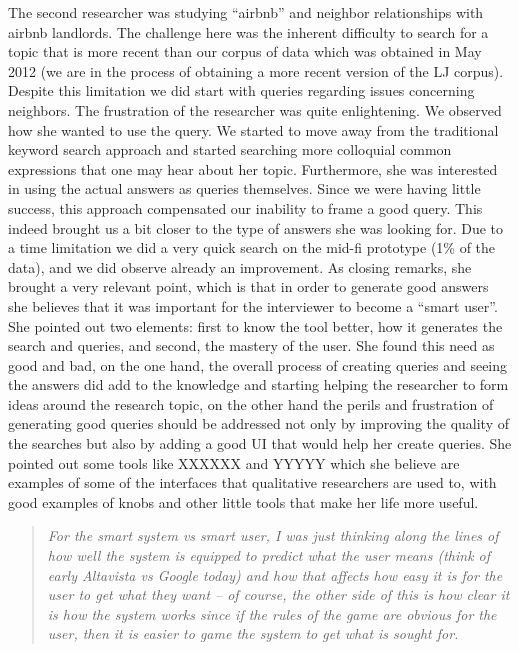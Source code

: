 \documentclass{sigchi}
\begin{document}
The second researcher was studying ``airbnb'' and neighbor relationships with airbnb landlords. The challenge here was the inherent difficulty to search for a topic that is more recent than our corpus of data which was obtained in May 2012 (we are in the process of obtaining a more recent version of the LJ corpus). Despite this limitation we did start with queries regarding issues concerning neighbors. The frustration of the researcher was quite enlightening. We observed how she wanted to use the query. We started to move away from the traditional keyword search approach and started searching more colloquial common expressions that one may hear about her topic. Furthermore, she was interested in using the actual answers as queries themselves. Since we were having little success, this approach compensated our inability to frame a good query. This indeed brought us a bit closer to the type of answers she was looking for. Due to a time limitation we did a very quick search on the mid-fi prototype (1\% of the data), and we did observe already an improvement. As closing remarks, she brought a very relevant point, which is that in order to generate good answers she believes that it was important for the interviewer to become a ``smart user''. She pointed out two elements: first to know the tool better, how it generates the search and queries, and second, the mastery of the user. She found this need as good and bad, on the one hand, the overall process of creating queries and seeing the answers did add to the knowledge and starting helping the researcher to form ideas around the research topic, on the other hand the perils and frustration of generating good queries should be addressed not only by improving the quality of the searches but also by adding a good UI that would help her create queries. She pointed out some tools like XXXXXX and YYYYY which she believe are examples of some of the interfaces that qualitative researchers are used to, with good examples of knobs and other little tools that make her life more useful. 

\begin{quote}
{\em
For the smart system vs smart user, I was just thinking along the lines of how well the system is equipped to predict what the user means (think of early Altavista vs Google today) and how that affects how easy it is for the user to get what they want -- of course, the other side of this is how clear it is how the system works since if the rules of the game are obvious for the user, then it is easier to game the system to get what is sought for.
}\end{quote}
\end{document}
